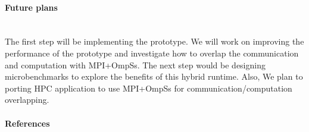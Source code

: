 \paragraph{Future plans}~\\

The first step will be implementing the prototype. We will work on improving
the performance of the prototype and investigate how to overlap the
communication and computation with MPI+OmpSs. The next step would be designing
microbenchmarks to explore the benefits of this hybrid runtime. Also, We plan
to porting HPC application to use MPI+OmpSs for communication/computation
overlapping.

\paragraph{References}~\\

